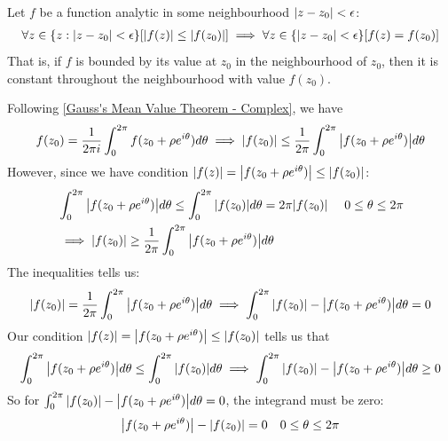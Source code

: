 \documentclass[12pt, english]{book}
\makeatletter
\renewenvironment{proof}[1][\proofname]{\par
	\pushQED{\qed}%
	\normalfont \topsep6\p@\@plus6\p@\relax
	\list{}{%
		\settowidth{\leftmargin}{\itshape\proofname:\hskip\labelsep}%
		\setlength{\labelwidth}{0pt}%
		\setlength{\itemindent}{-\leftmargin}%
		}%
	\item[\hskip\labelsep\itshape#1\@addpunct{:}]\ignorespaces
	}{\popQED\endlist\@endpefalse}
\makeatother
\begin{document}
	\begin{lemma}
		\label{Analytic function is bounded in neighbourhood implies constant value thoughout neighbourhood Lemma - Complex}
		Let \(f\) be a function analytic in some neighbourhood \(\abs{z-z_0}<\epsilon\):
		\begin{align*}
			\forall z \in \{z : \abs{z-z_0}<\epsilon\}
			[\abs{f(z)} \leq \abs{f(z_0)}] \implies \forall z \in \{\abs{z-z_0}<\epsilon\} [f(z) = f(z_0)]
		\end{align*}
		That is, if \(f\) is bounded by its value at \(z_0\) in the neighbourhood of \(z_0\), then it is constant throughout the neighbourhood with value \(f(z_0)\).
	\end{lemma}
	\begin{proof}
		Following \cref{Gauss's Mean Value Theorem - Complex}, we have 
		\begin{align*}
			f(z_0) = \frac{1}{2\pi i} \int_{0}^{2\pi} f(z_0 + \rho e^{i\theta}) d\theta 
			\implies \abs{f(z_0)} \leq \frac{1}{2\pi} \int_{0}^{2\pi} \abs{f(z_0 + \rho e^{i\theta})} d\theta
		\end{align*}
		However, since we have condition \(\abs{f(z)} =  \abs{f(z_0 + \rho e^{i\theta})} \leq \abs{f(z_0)}\):
		\begin{align*}
			&\int_{0}^{2\pi} \abs{f(z_0 + \rho e^{i\theta })} d \theta 
			 \leq \int_{0}^{2\pi} \abs{f(z_0)} d\theta = 2\pi \abs{f(z_0)} 
			&  \ 0 \leq \theta \leq 2 \pi \\
			&\implies \abs{f(z_0)} \geq \frac{1}{2\pi} \int_{0}^{2\pi} \abs{f(z_0 + \rho e^{i\theta })} d \theta 
		\end{align*}
		The inequalities tells us:
		\begin{align*}
			\abs{f(z_0)} = \frac{1}{2\pi} \int_{0}^{2\pi} \abs{f(z_0 + \rho e^{i\theta})} d\theta 
			\implies \int_{0}^{2\pi} \abs{f(z_0)} - \abs{f(z_0 + \rho e^{i\theta})} d\theta = 0
		\end{align*}
		Our condition \(\abs{f(z)} =  \abs{f(z_0 + \rho e^{i\theta})} \leq \abs{f(z_0)}\) tells us that 
		\begin{align*}
			\int_{0}^{2\pi} \abs{f(z_0 + \rho e^{i\theta})} d\theta \leq \int_{0}^{2\pi} \abs{f(z_0)} d\theta 
			\implies \int_{0}^{2\pi} \abs{f(z_0)} - \abs{f(z_0 + \rho e^{i\theta})} d\theta \geq 0
		\end{align*}
		So for \(\int_{0}^{2\pi} \abs{f(z_0)} - \abs{f(z_0 + \rho e^{i\theta})} d\theta = 0\), the integrand must be zero:
		\begin{align*}
			&\abs{f(z_0 + \rho e^{i\theta})} - \abs{f(z_0)} = 0 & 0\leq \theta \leq 2\pi \\

\end{align*}
\end{proof}
\end{document}
